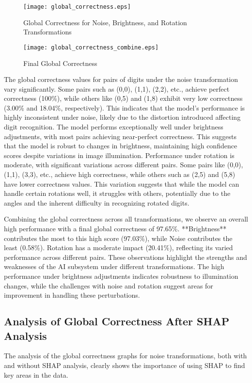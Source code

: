 \begin{figure}[H]
    \centering
    \texttt{[image: global\_correctness.eps]}
    \caption{Global Correctness for Noise, Brightness, and Rotation Transformations}
    \label{fig:global_correctness}
\end{figure}

\begin{figure}[H]
    \centering
    \texttt{[image: global\_correctness\_combine.eps]}
    \caption{Final Global Correctness}
    \label{fig:final_global_correctness}
\end{figure}

The global correctness values for pairs of digits under the noise transformation vary significantly. Some pairs such as (0,0), (1,1), (2,2), etc., achieve perfect correctness (100\%), while others like (0,5) and (1,8) exhibit very low correctness (3.00\% and 18.04\%, respectively). This indicates that the model's performance is highly inconsistent under noise, likely due to the distortion introduced affecting digit recognition. The model performs exceptionally well under brightness adjustments, with most pairs achieving near-perfect correctness. This suggests that the model is robust to changes in brightness, maintaining high confidence scores despite variations in image illumination. Performance under rotation is moderate, with significant variations across different pairs. Some pairs like (0,0), (1,1), (3,3), etc., achieve high correctness, while others such as (2,5) and (5,8) have lower correctness values. This variation suggests that while the model can handle certain rotations well, it struggles with others, potentially due to the angles and the inherent difficulty in recognizing rotated digits.

Combining the global correctness across all transformations, we observe an overall high performance with a final global correctness of 97.65\%. **Brightness** contributes the most to this high score (97.03\%), while Noise contributes the least (0.58\%). Rotation has a moderate impact (20.41\%), reflecting its varied performance across different pairs. These observations highlight the strengths and weaknesses of the AI subsystem under different transformations. The high performance under brightness adjustments indicates robustness to illumination changes, while the challenges with noise and rotation suggest areas for improvement in handling these perturbations.
\subsection{Analysis of Global Correctness After SHAP Analysis}
The analysis of the global correctness graphs for noise transformations, both with and without SHAP analysis, clearly shows the importance of using SHAP to find key areas in the data. 

